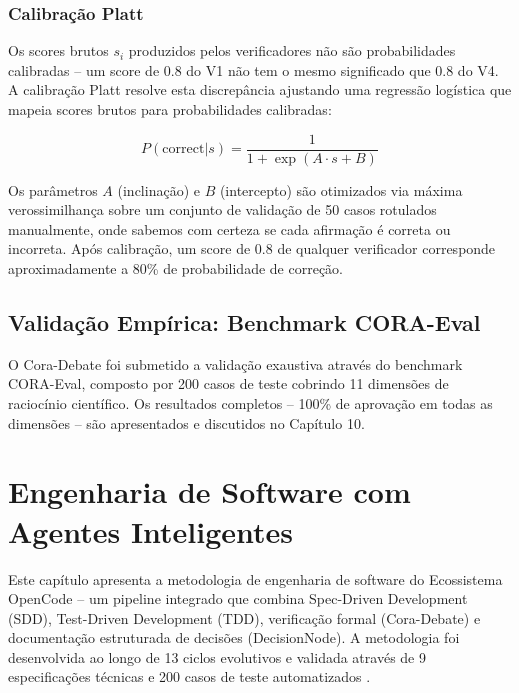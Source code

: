 \documentclass[12pt,a4paper,sumario=tradicional,openany]{abntex2}
\begin{document}
\subsection{Calibração Platt}

Os scores brutos $s_i$ produzidos pelos verificadores não são probabilidades calibradas -- um score de 0.8 do V1 não tem o mesmo significado que 0.8 do V4. A calibração Platt resolve esta discrepância ajustando uma regressão logística que mapeia scores brutos para probabilidades calibradas:

\begin{equation}
P(\text{correct}|s) = \frac{1}{1 + \exp(A \cdot s + B)}
\end{equation}

Os parâmetros $A$ (inclinação) e $B$ (intercepto) são otimizados via máxima verossimilhança sobre um conjunto de validação de 50 casos rotulados manualmente, onde sabemos com certeza se cada afirmação é correta ou incorreta. Após calibração, um score de 0.8 de qualquer verificador corresponde aproximadamente a 80\% de probabilidade de correção.

\section{Validação Empírica: Benchmark CORA-Eval}

O Cora-Debate foi submetido a validação exaustiva através do benchmark CORA-Eval, composto por 200 casos de teste cobrindo 11 dimensões de raciocínio científico. Os resultados completos -- 100\% de aprovação em todas as dimensões -- são apresentados e discutidos no Capítulo 10.

\chapter{Engenharia de Software com Agentes Inteligentes}

Este capítulo apresenta a metodologia de engenharia de software do Ecossistema OpenCode -- um pipeline integrado que combina Spec-Driven Development (SDD), Test-Driven Development (TDD), verificação formal (Cora-Debate) e documentação estruturada de decisões (DecisionNode). A metodologia foi desenvolvida ao longo de 13 ciclos evolutivos e validada através de 9 especificações técnicas e 200 casos de teste automatizados \cite{gomes2025sdscai, beck2003tdd, kruchten2009documentation}.
\end{document}

